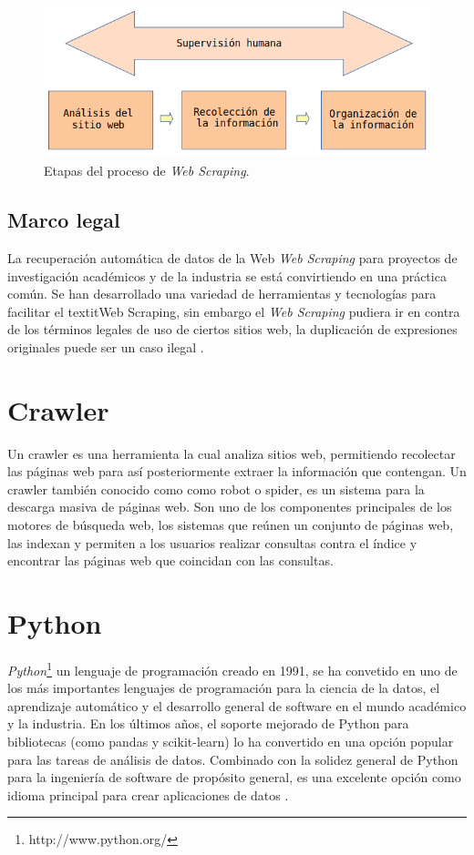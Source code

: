 \begin{figure}[H]
    \centering
    \includegraphics[scale=.35]{imagenes/Capitulo5/procesos}
    \caption{Etapas del proceso de \textit{Web Scraping}.}
    \label{fig:procesos}
  \end{figure}
  

\subsection{Marco legal}
La recuperación automática de datos de la Web \textit{Web Scraping} para proyectos de investigación académicos y de la 
industria se está convirtiendo en una práctica común. Se han desarrollado una variedad de herramientas y tecnologías 
para facilitar el textit{Web Scraping}, sin embargo el \textit{Web Scraping} pudiera ir en contra de los términos legales 
de uso de ciertos sitios web, la duplicación de expresiones originales puede ser un caso ilegal \citep{CTMarco}.


\section{Crawler}
Un crawler \citep{CT14} es una herramienta la cual analiza sitios web, permitiendo recolectar 
las páginas web para así posteriormente extraer la información que contengan. Un crawler también 
conocido como como robot o spider, es un sistema para la descarga masiva de páginas web. Son uno de 
los componentes principales de los motores de búsqueda web, los sistemas que reúnen un conjunto de 
páginas web, las indexan y permiten a los usuarios realizar consultas contra el índice y encontrar las 
páginas web que coincidan con las consultas.

\section{Python}
\textit{Python}\footnote{http://www.python.org/} un lenguaje de programación creado en 1991, se ha convetido en uno de los más 
importantes lenguajes de programación para la ciencia de la datos, el aprendizaje automático y el desarrollo general de software en 
el mundo académico y la industria. 
En los últimos años, el soporte mejorado de Python para bibliotecas (como pandas y scikit-learn) lo ha convertido en una opción popular 
para las tareas de análisis de datos. Combinado con la solidez general de Python para la ingeniería de software de propósito general, 
es una excelente opción como idioma principal para crear aplicaciones de datos \citep{CTPython}.

